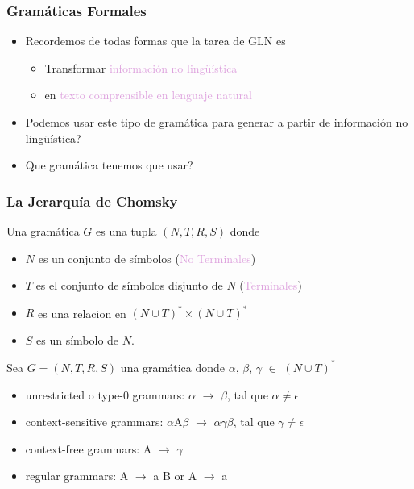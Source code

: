\documentclass[compress,color=usenames]{beamer}
\newcommand{\mH}[1]{\textcolor{Plum}{#1}}
\begin{document}
\begin{frame}
\frametitle{Gram\'aticas Formales}

\begin{itemize}
\item Recordemos de todas formas que la tarea de GLN es 
\begin{itemize}
\item Transformar \mH{informaci\'on no ling\"u\'istica}
\item en \mH{texto comprensible en lenguaje natural}
\end{itemize}
\item Podemos usar este tipo de gram\'atica para generar a partir de informaci\'on no 
ling\"u\'istica?
\item Que gram\'atica tenemos que usar?
\end{itemize}
\end{frame}

\begin{frame}
\frametitle{La Jerarqu\'ia de Chomsky}

Una gram\'atica $G$ es una tupla $(N, T, R, S)$ donde 
\begin{itemize}
\item $N$ es un conjunto de s\'imbolos (\mH{No Terminales})
\item $T$ es el conjunto de s\'imbolos disjunto de $N$ (\mH{Terminales})
\item $R$ es una relacion en $(N\cup T)^* \times (N\cup T)^*$
\item $S$ es un s\'imbolo de $N$. \pause 
\end{itemize}

Sea $G = (N, T, R, S)$ una gram\'atica donde  $\alpha$, $\beta$, $\gamma$ $\in$ $(N \cup T)^*$

\begin{itemize}
\item unrestricted o type-0 grammars: $\alpha$ $\rightarrow$ $\beta$, tal que $\alpha \not = \epsilon$

\item context-sensitive grammars: $\alpha$A$\beta$ $\rightarrow$ $\alpha$$\gamma$$\beta$, tal que $\gamma \not = \epsilon$

\item context-free grammars: A $\rightarrow$ $\gamma$

\item regular grammars: A $\rightarrow$ a B or A $\rightarrow$ a

\end{itemize}

\end{frame}
\end{document}
